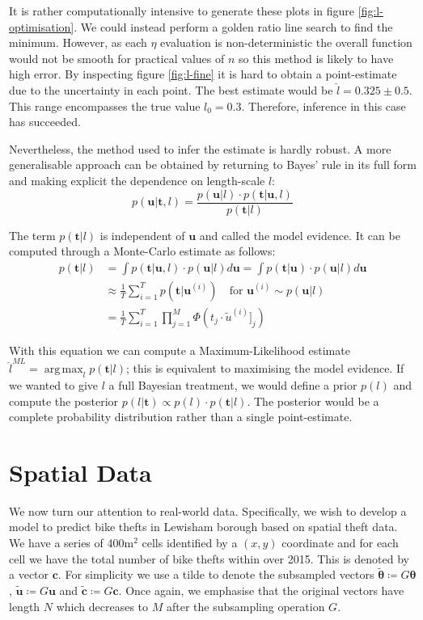 \documentclass[]{article}
\DeclareMathOperator*{\argmax}{arg\,max}
\newcommand{\cbold}{\boldsymbol{c}}
\newcommand{\tbold}{\boldsymbol{t}}
\newcommand{\ubold}{\boldsymbol{u}}
\newcommand{\thetabold}{\boldsymbol{\theta}}
\begin{document}
It is rather computationally intensive to generate these plots in figure \ref{fig:l-optimisation}. We could instead perform a golden ratio line search to find the minimum. However, as each $\eta$ evaluation is non-deterministic the overall function would not be smooth for practical values of $n$ so this method is likely to have high error. By inspecting figure \ref{fig:l-fine} it is hard to obtain a point-estimate due to the uncertainty in each point. The best estimate would be $\hat{l} = 0.325 \pm 0.5$. This range encompasses the true value $l_0 = 0.3$. Therefore, inference in this case has succeeded.

Nevertheless, the method used to infer the estimate is hardly robust. A more generalisable approach can be obtained by returning to Bayes' rule in its full form and making explicit the dependence on length-scale $l$:
%
\begin{equation}
	p(\ubold | \tbold, l) = \frac{p(\ubold | l) \cdot p(\tbold | \ubold, l)}{p(\tbold | l)}
	\label{eqn:bayes}
\end{equation}

The term $p(\tbold | l)$ is independent of $\ubold$ and called the model evidence. It can be computed through a Monte-Carlo estimate as follows:
%
\begin{align}
	p(\tbold | l) &= \int p(\tbold | \ubold, l) \cdot p(\ubold | l) d\ubold = \int p(\tbold | \ubold) \cdot p(\ubold | l) d\ubold  \nonumber \\
	&\approx \frac{1}{T} \sum_{i=1}^{T} p(\tbold | \ubold^{(i)}) \quad \textrm{for } \ubold^{(i)} \sim p(\ubold | l) \nonumber \\
	&= \frac{1}{T} \sum_{i=1}^{T} \prod_{j=1}^{M} \Phi(t_j \cdot \tilde{u}^{(i)}]_j)
\end{align}

With this equation we can compute a Maximum-Likelihood estimate $\hat{l}^{ML} = \argmax_l p(\tbold | l)$; this is equivalent to maximising the model evidence. If we wanted to give $l$ a full Bayesian treatment, we would define a prior $p(l)$ and compute the posterior $p(l | \tbold) \propto p(l) \cdot p(\tbold | l)$. The posterior would be a complete probability distribution rather than a single point-estimate.

\section{Spatial Data}

We now turn our attention to real-world data. Specifically, we wish to develop a model to predict bike thefts in Lewisham borough based on spatial theft data. We have a series of 400m$^2$ cells identified by a $(x, y)$ coordinate and for each cell we have the total number of bike thefts within over 2015. This is denoted by a vector $\cbold$. For simplicity we use a tilde to denote the subsampled vectors $\tilde{\thetabold} \coloneqq G\thetabold$, $\tilde{\ubold} \coloneqq G\ubold$ and $\tilde{\cbold} \coloneqq G\cbold$. Once again, we emphasise that the original vectors have length $N$ which decreases to $M$ after the subsampling operation $G$.
\end{document}
